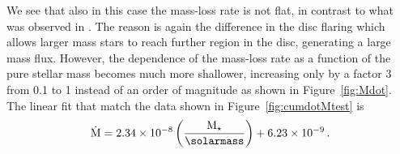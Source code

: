 \documentclass[usenatbib,useAMS,usedcolumn]{mnras}
\begin{document}
We see that also in this case the mass-loss rate is not flat, in contrast to what was observed in . The reason is again the difference in the disc flaring which allows larger mass stars to reach further region in the disc, generating a large mass flux. However, the dependence of the mass-loss rate as a function of the pure stellar mass becomes much more shallower, increasing only by a factor $3$ from \SI{0.1}{\solarmass} to \SI{1}{\solarmass} instead of an order of magnitude as shown in Figure~\ref{fig:Mdot}.
The linear fit that match the data shown in Figure~\ref{fig:cumdotMtest} is
\begin{equation}
    \dot{\mathrm{M}} = 2.34 \times 10^{-8} \left(\frac{\mathrm{M}_\star}{\si{\solarmass}}\right) + 6.23 \times 10^{-9}\,.
\end{equation}

\end{document}
